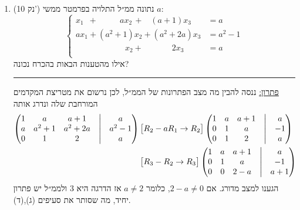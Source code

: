 \documentclass[12pt, a4paper]{article}
\newcommand{\rr}{\mathbb{R}}
\newcommand{\points}[1]{(#1 נק') }
\begin{document}
\begin{enumerate}
\newpage

\item\points{10}
נתונה ממ״ל התלויה בפרמטר ממשי
$a$:
$$\begin{cases}
x_1\,\,\,+\quad \quad\,\,\, \, ax_2\,+\,\,\,\,\,(a+1)x_3&=a\\
ax_1+(a^2+1)x_2+(a^2+2a)x_3&=a^2-1\\
\quad\quad \quad\quad\quad\quad x_2+\quad\quad\quad\,\, \,2x_3&=a\\
\end{cases}$$
אילו מהטענות הבאות בהכרח נכונה?
\begin{enumerate}
\end{enumerate}

\noindent\rule{16cm}{0.4pt}
 
 \underline{פתרון:}
 ננסה להבין מה מצב הפתרונות של הממ״ל, לכן נרשום את מטריצת המקדמים המורחבת שלה ונדרג אותה
 \begin{align*}
 \begin{pmatrix}
 1&a&a+1&\bigm|&a\\
 a&a^2+1&a^2+2a&\bigm|&a^2-1\\
 0&1&2&\bigm|&a\\
 \end{pmatrix}
 &\begin{bmatrix}
 R_2-aR_1\rightarrow R_2\\
 \end{bmatrix}
  \begin{pmatrix}
 1&a&a+1&\bigm|&a\\
 0&1&a&\bigm|&-1\\
 0&1&2&\bigm|&a\\
 \end{pmatrix}
 \\&\begin{bmatrix}
 R_3-R_2\rightarrow R_3\\
 \end{bmatrix}
  \begin{pmatrix}
 1&a&a+1&\bigm|&a\\
 0&1&a&\bigm|&-1\\
 0&0&2-a&\bigm|&a+1\\
 \end{pmatrix}
 \end{align*}
הגענו למצב מדורג. אם
$2-a\neq0$,
כלומר
$a\neq 2$
אז הדרגה היא
$3$
ולממ״ל יש פתרון יחיד, מה שסותר את סעיפים (ג),(ד).


\end{enumerate}
\end{document}
